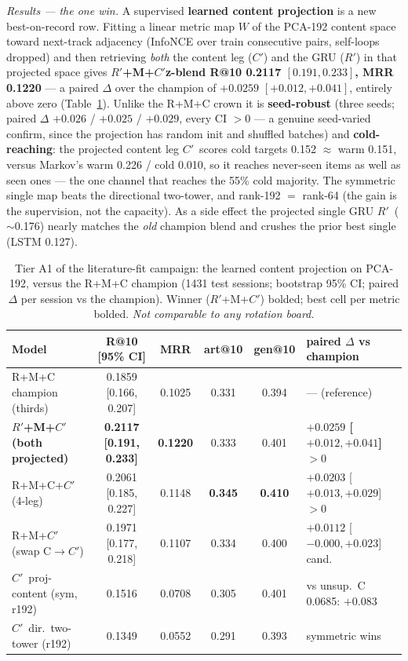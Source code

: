 \documentclass[11pt]{article}
\newcommand{\best}[1]{\textbf{#1}}
\newcommand{\Rp}{\ensuremath{R'}}
\newcommand{\Cp}{\ensuremath{C'}}
\begin{document}
\emph{Results --- the one win.} A supervised \textbf{learned content projection}
is a new best-on-record row. Fitting a linear metric map $W$ of the PCA-192
content space toward next-track adjacency (InfoNCE over train consecutive pairs,
self-loops dropped) and then retrieving \emph{both} the content leg (\Cp) and the
GRU (\Rp) in that projected space gives \textbf{\Rp+M+\Cp z-blend R@10 \num{0.2117}
$[0.191, 0.233]$, MRR \num{0.1220}} --- a paired $\Delta$ over the champion of
$+\num{0.0259}$ $[+0.012, +0.041]$, entirely above zero
(Table~\ref{tab:nexttrack-projection}). Unlike the R+M+C crown it is
\textbf{seed-robust} (three seeds; paired $\Delta$ $+\num{0.026}$ / $+\num{0.025}$ /
$+\num{0.029}$, every CI $>0$ --- a genuine seed-varied confirm, since the
projection has random init and shuffled batches) and \textbf{cold-reaching}: the
projected content leg \Cp\ scores cold targets \num{0.152} $\approx$ warm
\num{0.151}, versus Markov's warm \num{0.226} / cold \num{0.010}, so it reaches
never-seen items as well as seen ones --- the one channel that reaches the 55\% cold
majority. The symmetric single map beats the directional two-tower, and rank-192
$=$ rank-64 (the gain is the supervision, not the capacity). As a side effect the
projected single GRU \Rp\ ($\sim$\num{0.176}) nearly matches the \emph{old}
champion blend and crushes the prior best single (LSTM \num{0.127}).

\begin{table}[ht]
  \centering
  \caption{Tier A1 of the literature-fit campaign: the learned content projection
  on PCA-192, versus the R+M+C champion (\num{1431} test sessions; bootstrap 95\%
  CI; paired $\Delta$ per session vs the champion). Winner (\Rp+M+\Cp) bolded; best
  cell per metric bolded. \emph{Not comparable to any rotation board.}}
  \label{tab:nexttrack-projection}
  {\footnotesize\setlength{\tabcolsep}{4pt}\begin{tabular}{lccccl}
    \toprule
    Model & R@10 [95\% CI] & MRR & art@10 & gen@10 & paired $\Delta$ vs champion \\
    \midrule
    R+M+C champion (thirds)           & 0.1859 [0.166, 0.207] & 0.1025 & 0.331 & 0.394 & --- (reference) \\
    \best{\Rp+M+\Cp (both projected)} & \best{0.2117 [0.191, 0.233]} & \best{0.1220} & 0.333 & 0.401 & \best{$+0.0259$ [$+0.012,+0.041$] $>0$} \\
    R+M+C+\Cp (4-leg)                 & 0.2061 [0.185, 0.227] & 0.1148 & \best{0.345} & \best{0.410} & $+0.0203$ [$+0.013,+0.029$] $>0$ \\
    R+M+\Cp (swap C$\to$\Cp)          & 0.1971 [0.177, 0.218] & 0.1107 & 0.334 & 0.400 & $+0.0112$ [$-0.000,+0.023$] cand. \\
    \Cp\ proj-content (sym, r192)     & 0.1516 & 0.0708 & 0.305 & 0.401 & vs unsup.\ C 0.0685: $+0.083$ \\
    \Cp\ dir.\ two-tower (r192)       & 0.1349 & 0.0552 & 0.291 & 0.393 & symmetric wins \\
    \bottomrule
  \end{tabular}}
\end{table}
\end{document}
